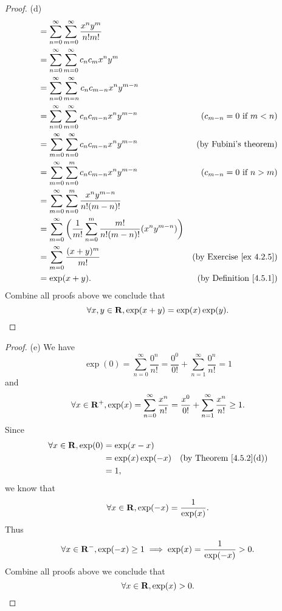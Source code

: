 \begin{proof}{(d)}
\begin{align*}
         & = \sum_{n = 0}^\infty \sum_{m = 0}^\infty \frac{x^n y^m}{n! m!}                                                                            \\
         & = \sum_{n = 0}^\infty \sum_{m = 0}^\infty c_n c_m x^n y^m                                                                                  \\
         & = \sum_{n = 0}^\infty \sum_{m = n}^\infty c_n c_{m - n} x^n y^{m - n}                                                                      \\
         & = \sum_{n = 0}^\infty \sum_{m = 0}^\infty c_n c_{m - n} x^n y^{m - n}                                & (c_{m - n} = 0 \text{ if } m < n)   \\
         & = \sum_{m = 0}^\infty \sum_{n = 0}^\infty c_n c_{m - n} x^n y^{m - n}                                & \text{(by Fubini's theorem)}        \\
         & = \sum_{m = 0}^\infty \sum_{n = 0}^m c_n c_{m - n} x^n y^{m - n}                                     & (c_{m - n} = 0 \text{ if } n > m)   \\
         & = \sum_{m = 0}^\infty \sum_{n = 0}^m \frac{x^n y^{m - n}}{n! (m - n)!}                                                                     \\
         & = \sum_{m = 0}^\infty \bigg(\frac{1}{m!} \sum_{n = 0}^m \frac{m!}{n! (m - n)!} (x^n y^{m - n})\bigg)                                       \\
         & = \sum_{m = 0}^\infty \frac{(x + y)^m}{m!}                                                           & \text{(by Exercise \ref{ex 4.2.5})} \\
         & = \exp(x + y).                                                                                       & \text{(by Definition \ref{4.5.1})}
    \end{align*}
    Combine all proofs above we conclude that
    \[
        \forall x, y \in \mathbf{R}, \exp(x + y) = \exp(x) \exp(y).
    \]
\end{proof}

\begin{proof}{(e)}
    We have
    \[
        \exp(0) = \sum_{n = 0}^\infty \frac{0^n}{n!} = \frac{0^0}{0!} + \sum_{n = 1}^\infty \frac{0^n}{n!} = 1
    \]
    and
    \[
        \forall x \in \mathbf{R}^+, \exp(x) = \sum_{n = 0}^\infty \frac{x^n}{n!} = \frac{x^0}{0!} + \sum_{n = 1}^\infty \frac{x^n}{n!} \geq 1.
    \]
    Since
    \begin{align*}
        \forall x \in \mathbf{R}, \exp(0) & = \exp(x - x)                                           \\
                                  & = \exp(x) \exp(-x) & \text{(by Theorem \ref{4.5.2}(d))} \\
                                  & = 1,
    \end{align*}
    we know that
    \[
        \forall x \in \mathbf{R}, \exp(-x) = \frac{1}{\exp(x)}.
    \]
    Thus
    \[
        \forall x \in \mathbf{R}^-, \exp(-x) \geq 1 \implies \exp(x) = \frac{1}{\exp(-x)} > 0.
    \]
    Combine all proofs above we conclude that
    \[
        \forall x \in \mathbf{R}, \exp(x) > 0.
    \]
\end{proof}

